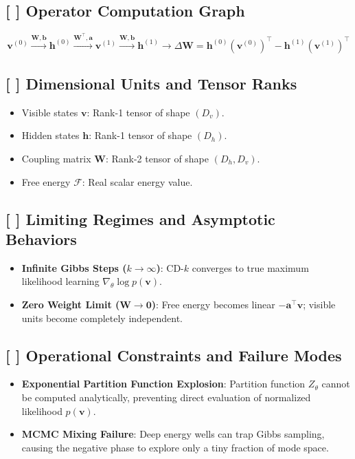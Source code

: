 \documentclass[11pt,a4paper]{article}
\theoremstyle{definition}
\begin{document}
\subsection{[ ] Operator Computation Graph}
{\boldmath
\begin{equation}
\mathbf{v}^{(0)} \xrightarrow{\mathbf{W}, \mathbf{b}} \mathbf{h}^{(0)} \xrightarrow{\mathbf{W}^\top, \mathbf{a}} \mathbf{v}^{(1)} \xrightarrow{\mathbf{W}, \mathbf{b}} \mathbf{h}^{(1)} \longrightarrow \Delta \mathbf{W} = \mathbf{h}^{(0)} (\mathbf{v}^{(0)})^\top - \mathbf{h}^{(1)} (\mathbf{v}^{(1)})^\top
\end{equation}
}

\subsection{[ ] Dimensional Units and Tensor Ranks}
\begin{itemize}
    \item Visible states $\mathbf{v}$: Rank-1 tensor of shape $(D_v)$.
    \item Hidden states $\mathbf{h}$: Rank-1 tensor of shape $(D_h)$.
    \item Coupling matrix $\mathbf{W}$: Rank-2 tensor of shape $(D_h, D_v)$.
    \item Free energy $\mathcal{F}$: Real scalar energy value.
\end{itemize}

\subsection{[ ] Limiting Regimes and Asymptotic Behaviors}
\begin{itemize}
    \item \textbf{Infinite Gibbs Steps ($k \to \infty$)}: CD-$k$ converges to true maximum likelihood learning $\nabla_\theta \log p(\mathbf{v})$.
    \item \textbf{Zero Weight Limit ($\mathbf{W} \to \mathbf{0}$)}: Free energy becomes linear $-\mathbf{a}^\top \mathbf{v}$; visible units become completely independent.
\end{itemize}

\subsection{[ ] Operational Constraints and Failure Modes}
\begin{itemize}
    \item \textbf{Exponential Partition Function Explosion}: Partition function $Z_\theta$ cannot be computed analytically, preventing direct evaluation of normalized likelihood $p(\mathbf{v})$.
    \item \textbf{MCMC Mixing Failure}: Deep energy wells can trap Gibbs sampling, causing the negative phase to explore only a tiny fraction of mode space.
\end{itemize}
\end{document}
